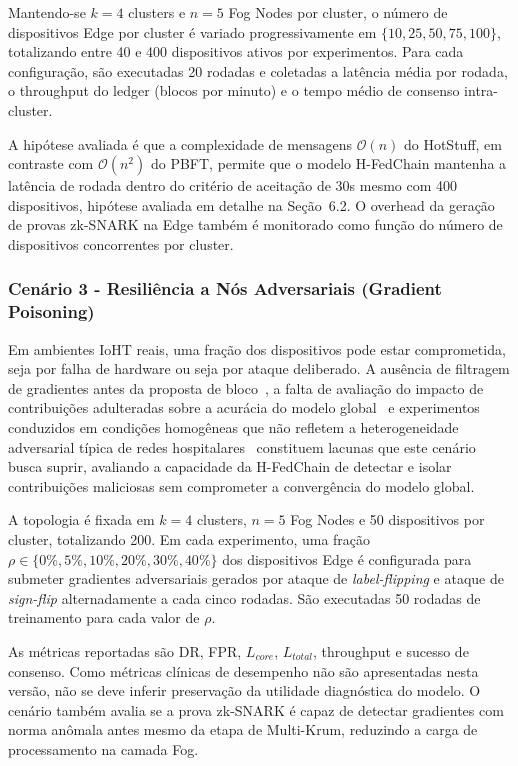 \documentclass[12pt]{article}
\begin{document}
Mantendo-se $k=4$ clusters e $n=5$ Fog Nodes por cluster, o número de dispositivos Edge por cluster é variado progressivamente em $\{10, 25, 50, 75, 100\}$, totalizando entre 40 e 400 dispositivos ativos por experimentos. Para cada configuração, são executadas 20 rodadas e coletadas a latência média por rodada, o throughput do ledger (blocos por minuto) e o tempo médio de consenso intra-cluster.

A hipótese avaliada é que a complexidade de mensagens $\mathcal{O}(n)$ do HotStuff, em contraste com $\mathcal{O}(n^2)$ do PBFT, permite que o modelo H-FedChain mantenha a latência de rodada dentro do critério de aceitação de 30s mesmo com 400 dispositivos, hipótese avaliada em detalhe na Seção~6.2. O overhead da geração de provas zk-SNARK na Edge também é monitorado como função do número de dispositivos concorrentes por cluster.

\subsubsection{Cenário 3 - Resiliência a Nós Adversariais (Gradient Poisoning)}

Em ambientes IoHT reais, uma fração dos dispositivos pode estar comprometida, seja por falha de hardware ou  seja por ataque deliberado. A ausência de filtragem de gradientes antes da proposta de bloco~\cite{ren2024}, a falta de avaliação do impacto de contribuições adulteradas sobre a acurácia do modelo global~\cite{baucas2023} e experimentos conduzidos em condições homogêneas que não refletem a heterogeneidade adversarial típica de redes hospitalares~\cite{murthy2026} constituem lacunas que este cenário busca suprir, avaliando a capacidade da H-FedChain de detectar e isolar contribuições maliciosas sem comprometer a convergência do modelo global.

A topologia é fixada em $k=4$ clusters, $n=5$ Fog Nodes e 50 dispositivos por cluster, totalizando 200. Em cada experimento, uma fração $\rho \in \{0\%, 5\%, 10\%, 20\%, 30\%, 40\%\}$ dos dispositivos Edge é configurada para submeter gradientes adversariais gerados por ataque de \textit{label-flipping} e ataque de \textit{sign-flip} alternadamente a cada cinco rodadas. São executadas 50 rodadas de treinamento para cada valor de $\rho$.

As métricas reportadas são DR, FPR, $L_{core}$, $L_{total}$, throughput e sucesso de consenso. Como métricas clínicas de desempenho não são apresentadas nesta versão, não se deve inferir preservação da utilidade diagnóstica do modelo. O cenário também avalia se a prova zk-SNARK é capaz de detectar gradientes com norma anômala antes mesmo da etapa de Multi-Krum, reduzindo a carga de processamento na camada Fog.
\end{document}
